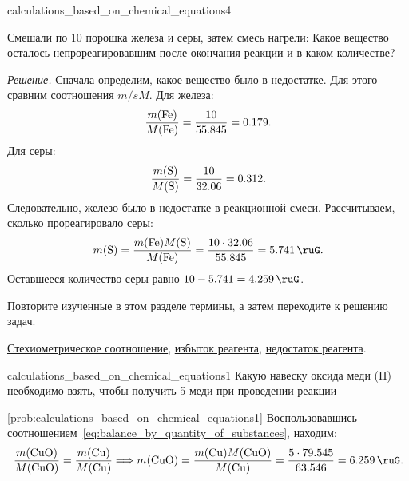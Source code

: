 \begin{example}{}{calculations_based_on_chemical_equations4}
    \begin{condition}
        Смешали по \qty{10}{\ruG} порошка железа и серы, затем смесь нагрели:
        Какое вещество осталось непрореагировавшим после окончания реакции и в каком количестве?
    \end{condition}

    \medskip

    \textit{Решение.} Сначала определим, какое вещество было в недостатке. Для этого сравним соотношения ${m}/{sM}$. Для железа:
    \begin{equation*}
        \frac{m(\ce{Fe})}{M(\ce{Fe})} = \frac{10}{\num{55,845}} = \num{0,179}.
    \end{equation*}
    Для серы:
    \begin{equation*}
        \frac{m(\ce{S})}{M(\ce{S})} = \frac{10}{\num{32,06}} = \num{0,312}.
    \end{equation*}
    Следовательно, железо было в недостатке в реакционной смеси. Рассчитываем, сколько прореагировало серы:
    \begin{equation*}
        m(\ce{S}) = \frac{m(\ce{Fe})M(\ce{S})}{M(\ce{Fe})} = \frac{10 \cdot \num{32,06}}{\num{55,845}} = \qty{5,741}{\ruG}.
    \end{equation*}
    Оставшееся количество серы равно $10 - \num{5,741} = \qty{4,259}{\ruG}$.
\end{example}

Повторите изученные в этом разделе термины, а затем переходите к решению задач.

\begin{termlist}
    \hyperref[term:stoichiometric_ratio]{Стехиометрическое соотношение},
    \hyperref[term:excess_of_reagent]{избыток реагента},
    \hyperref[term:limiting_reagent]{недостаток реагента}.
\end{termlist}

\begin{problem}{}{calculations_based_on_chemical_equations1}
    Какую навеску оксида меди (II) необходимо взять, чтобы получить \qty{5}{\ruG} меди при проведении реакции
    \begin{sol}{\ref{prob:calculations_based_on_chemical_equations1}}
        Воспользовавшись соотношением~\eqref{eq:balance_by_quantity_of_substances}, находим:
        \begin{equation*}
            \frac{m(\ce{CuO})}{M(\ce{CuO})} = \frac{m(\ce{Cu})}{M(\ce{Cu})} \Longrightarrow m(\ce{CuO}) = \frac{m(\ce{Cu})M(\ce{CuO})}{M(\ce{Cu})} = \frac{5 \cdot \num{79,545}}{\num{63,546}} = \qty{6,259}{\ruG}.
        \end{equation*}
    \end{sol}
\end{problem}

